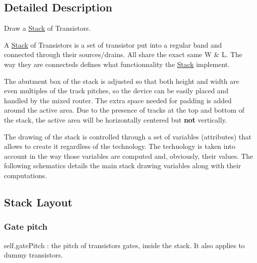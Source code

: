 \subsection{Detailed Description}
Draw a \mbox{\hyperlink{classpython_1_1stack_1_1Stack}{Stack}} of Transistors. 

A \mbox{\hyperlink{classpython_1_1stack_1_1Stack}{Stack}} of Transistors is a set of transistor put into a regular band and connected through their sources/drains. All share the exact same W \& L. The way they are connecteds defines what functionnality the \mbox{\hyperlink{classpython_1_1stack_1_1Stack}{Stack}} implement.

The abutment box of the stack is adjusted so that both height and width are even multiples of the track pitches, so the device can be easily placed and handled by the mixed router. The extra space needed for padding is added around the active area. Due to the presence of tracks at the top and bottom of the stack, the active area will be horizontally centered but {\bfseries not} vertically.

The drawing of the stack is controlled through a set of variables (attributes) that allows to create it regardless of the technology. The technology is taken into account in the way those variables are computed and, obviously, their values. The following schematics details the main stack drawing variables along with their computations.\hypertarget{classpython_1_1stack_1_1Stack_secStackLayout}{}\subsection{Stack Layout}\label{classpython_1_1stack_1_1Stack_secStackLayout}
\hypertarget{classpython_1_1stack_1_1Stack_secGatePitch}{}\subsubsection{Gate pitch}\label{classpython_1_1stack_1_1Stack_secGatePitch}

\begin{DoxyItemize}
\item {\ttfamily self.\+gate\+Pitch} \+: the pitch of transistors gates, inside the stack. It also applies to dummy transistors.
\end{DoxyItemize}

